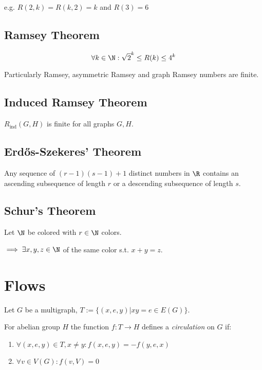 \spacing

e.g. $R(2,k) = R(k,2) = k$ and $R(3) = 6$

\subsection*{Ramsey Theorem}

\vspace*{-2mm}
$$\forall k \in \N : \sqrt{2}^k \leq R(k) \leq 4^k$$

Particularly Ramsey, asymmetric Ramsey and graph Ramsey numbers are finite.

\subsection*{Induced Ramsey Theorem}

$R_\text{ind}(G,H)$ is finite for all graphs $G, H$.

\subsection*{Erd\H{o}s-Szekeres' Theorem}

Any sequence of $(r-1)(s-1)+1$ distinct numbers in $\R$ contains an ascending subsequence of length $r$ or a descending subsequence of length $s$.

\subsection*{Schur's Theorem}

Let $\N$ be colored with $r \in \N$ colors.

$\implies \exists x, y, z \in \N$ of the same color s.t. $x+y=z$.

\section*{Flows}

Let $G$ be a multigraph, $T := \{(x,e,y) | xy = e \in E(G)\}$.

For abelian group $H$ the function $f : T \to H$ defines a \emph{circulation} on $G$ if:

\begin{enumerate}
	\item $\forall (x,e,y) \in T, x \neq y : f(x,e,y) = -f(y,e,x)$
	\item $\forall v \in V(G) : f(v,V) = 0$
\end{enumerate}

